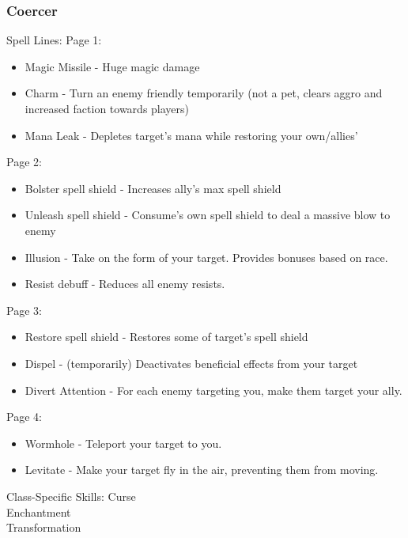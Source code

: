 \documentclass{article}
\begin{document}
\subsubsection{Coercer}
Spell Lines:
Page 1:
\begin{itemize}
    \item Magic Missile - Huge magic damage
    \item Charm - Turn an enemy friendly temporarily (not a pet, clears aggro and increased faction towards players)
    \item Mana Leak - Depletes target's mana while restoring your own/allies'
    
\end{itemize}

Page 2:
\begin{itemize}
    \item Bolster spell shield - Increases ally's max spell shield
    \item Unleash spell shield - Consume's own spell shield to deal a massive blow to enemy
    \item Illusion - Take on the form of your target. Provides bonuses based on race.
    \item Resist debuff - Reduces all enemy resists.
    
\end{itemize}

Page 3:
\begin{itemize}
    \item Restore spell shield - Restores some of target's spell shield
    \item Dispel - (temporarily) Deactivates beneficial effects from your target
    \item Divert Attention - For each enemy targeting you, make them target your ally.
    
\end{itemize}

Page 4:
\begin{itemize}
    \item Wormhole - Teleport your target to you.
    \item Levitate - Make your target fly in the air, preventing them from moving.
    
\end{itemize}

Class-Specific Skills:
Curse\\
Enchantment\\
Transformation\\
\end{document}
